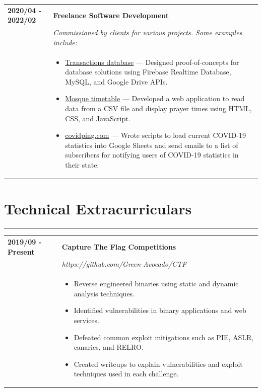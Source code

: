 \documentclass[letterpaper]{article}
\newcommand{\sectcolor}{cyan}
\newcommand{\sect}[1]{\section*{#1}
                        {\color{\sectcolor}
                        \rule{\textwidth}{1pt}
                        \vspace{-4pt}}}
\begin{document}
        \begin{tabular}{p{} p{}}
            \textbf{2020/04 - 2022/02} & \textbf{Freelance Software Development} \\
            & \emph{Commissioned by clients for various projects. Some examples include:} \\
            & \begin{itemize}
                \item \underline{Transactions database} ---
                    Designed proof-of-concepts for database solutions using Firebase Realtime Database,
                    MySQL, and Google Drive APIs.
                \item \underline{Mosque timetable} ---
                    Developed a web application to read data from a CSV file and display prayer times
                    using HTML, CSS, and JavaScript.
                \item \underline{covidping.com} ---
                    Wrote scripts to load current COVID-19 statistics into Google Sheets and send emails
                    to a list of subscribers for notifying users of COVID-19 statistics in their state.
            \end{itemize}
        \end{tabular}

    \sect{Technical Extracurriculars}

        \begin{tabular}{p{} p{}}
            \textbf{2019/09 - Present} & \textbf{Capture The Flag Competitions} \\
            & \emph{https://github.com/Green-Avocado/CTF} \\
            & \begin{itemize}
                \item Reverse engineered binaries using static and dynamic analysis techniques.
                \item Identified vulnerabilities in binary applications and web services.
                \item Defeated common exploit mitigations such as PIE, ASLR, canaries, and RELRO.
                \item Created writeups to explain vulnerabilities and exploit techniques used in each
                    challenge.
            \end{itemize}
        \end{tabular}
\end{document}
